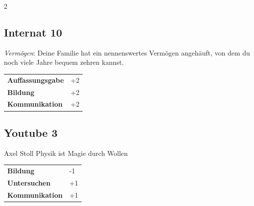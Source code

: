 \begin{multicols}{2}
\begin{tcolorbox}

\end{tcolorbox}

\begin{tcolorbox}
    \subsection*{Internat \hfill \small{10 }}
    \tcblower
\textit{Vermögen}: Deine Familie hat ein nennenswertes Vermögen angehäuft, von dem du noch viele Jahre bequem zehren kannst.


\vspace{3mm}

\begin{tabular}{@{}ll@{}}
    \textbf{Auffassungsgabe} & +2\\
    \textbf{Bildung} & +2\\
    \textbf{Kommunikation} & +2\\
\end{tabular}


\end{tcolorbox}

\begin{tcolorbox}
    \subsection*{Youtube \hfill \small{3 }}
    \tcblower


\begin{pquote}{Axel Stoll}
Physik ist Magie durch Wollen
\end{pquote}

\vspace{3mm}

\begin{tabular}{@{}ll@{}}
    \textbf{Bildung} & -1\\
    \textbf{Untersuchen} & +1\\
    \textbf{Kommunikation} & +1\\
\end{tabular}


\end{tcolorbox}
\end{multicols}
